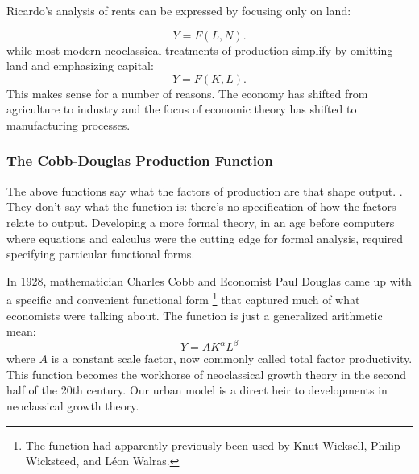 Ricardo's analysis of rents  can be expressed by focusing only on land:

\begin{equation} 
Y=F(L,N).
\label{eqn-production-ricardo-2}
\end{equation} 
while most modern neoclassical treatments of production simplify by omitting land and emphasizing capital:\begin{equation} 
Y=F(K,L).
\label{eqn-production}
\end{equation}  
This makes sense for a number of reasons. The economy has shifted from agriculture to industry and the focus of economic theory has shifted to manufacturing processes.




\subsubsection{The Cobb-Douglas Production Function}
The above functions say what the factors of production are that shape output. . They don't say what the function is: there's no specification of how the factors relate to output. Developing a more formal theory, in an age before computers where equations and calculus were the cutting edge for formal analysis, required specifying particular functional forms.

In 1928, mathematician Charles Cobb and Economist Paul Douglas came up with a specific and convenient functional form \cite{cobbTheoryProduction1928}\footnote{The function had apparently previously been used by Knut Wicksell, Philip Wicksteed, and L\'eon Walras.} that captured much of what economists were talking about. The function is just a \gls{generalized arithmetic mean}:
 \[Y=AK^\alpha L^\beta\]
 where $A$ is a constant scale factor, now commonly called \gls{total factor productivity}. This function becomes the workhorse of neoclassical growth theory in the second half  of the 20th century. Our urban model is a direct heir to developments in neoclassical growth theory.
 
